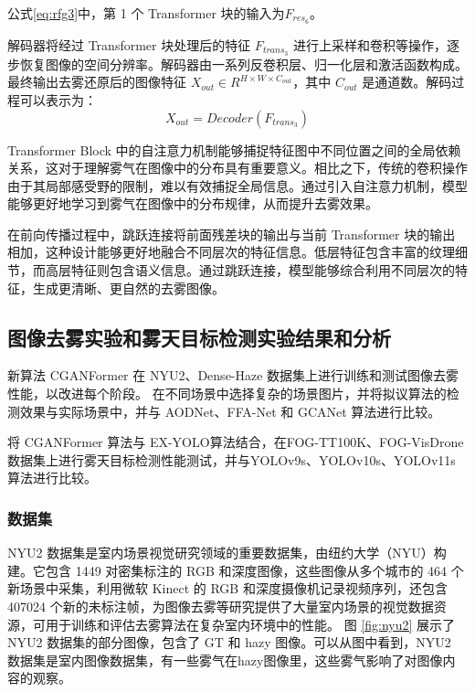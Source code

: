 公式\ref{eq:rfg3}中，第 1 个 Transformer 块的输入为$F_{res_6}$。

解码器将经过 Transformer 块处理后的特征 $F_{trans_3}$ 进行上采样和卷积等操作，逐步恢复图像的空间分辨率。解码器由一系列反卷积层、归一化层和激活函数构成。最终输出去雾还原后的图像特征 $X_{out} \in R^{H \times W \times C_{out}}$，其中 $C_{out}$ 是通道数。解码过程可以表示为：
\begin{equation}
    \label{eq:rfg4}
    X_{out} = Decoder(F_{trans_3})
\end{equation}


Transformer Block 中的自注意力机制能够捕捉特征图中不同位置之间的全局依赖关系，这对于理解雾气在图像中的分布具有重要意义。相比之下，传统的卷积操作由于其局部感受野的限制，难以有效捕捉全局信息。通过引入自注意力机制，模型能够更好地学习到雾气在图像中的分布规律，从而提升去雾效果。

在前向传播过程中，跳跃连接将前面残差块的输出与当前 Transformer 块的输出相加，这种设计能够更好地融合不同层次的特征信息。低层特征包含丰富的纹理细节，而高层特征则包含语义信息。通过跳跃连接，模型能够综合利用不同层次的特征，生成更清晰、更自然的去雾图像。

\subsection{图像去雾实验和雾天目标检测实验结果和分析}

新算法 CGANFormer 在 NYU2\cite{nyu2}、Dense-Haze\cite{NTIRE_Dehazing_2019} 数据集上进行训练和测试图像去雾性能，以改进每个阶段。
在不同场景中选择复杂的场景图片，并将拟议算法的检测效果与实际场景中，并与 AODNet\cite{li2017aod}、FFA-Net\cite{ffa} 和 GCANet\cite{chen2019gated} 算法进行比较。

将 CGANFormer 算法与 EX-YOLO算法结合，在FOG-TT100K、FOG-VisDrone数据集上进行雾天目标检测性能测试，并与YOLOv9s\cite{yolov9}、YOLOv10s\cite{yolov10}、YOLOv11s\cite{yolov11}算法进行比较。

\subsubsection{数据集}

NYU2 数据集是室内场景视觉研究领域的重要数据集，由纽约大学（NYU）构建。它包含 1449 对密集标注的 RGB 和深度图像，这些图像从多个城市的 464 个新场景中采集，利用微软 Kinect 的 RGB 和深度摄像机记录视频序列，还包含 407024 个新的未标注帧，为图像去雾等研究提供了大量室内场景的视觉数据资源，可用于训练和评估去雾算法在复杂室内环境中的性能。
图 \ref{fig:nyu2} 展示了 NYU2 数据集的部分图像，包含了 GT 和 hazy 图像。可以从图中看到，NYU2 数据集是室内图像数据集，有一些雾气在hazy图像里，这些雾气影响了对图像内容的观察。

